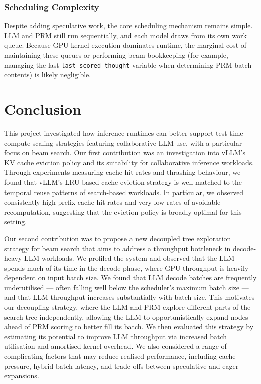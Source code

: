 \documentclass[11pt,twoside]{report}
\begin{document}

\subsection{Scheduling Complexity}
Despite adding speculative work, the core scheduling mechanism remains simple. 
LLM and PRM still run sequentially, and each model draws from its own work queue. 
Because GPU kernel execution dominates runtime, the marginal cost of maintaining these queues or performing beam bookkeeping (for example, managing the last \texttt{last\_scored\_thought} variable when determining PRM batch contents) is likely negligible. 


\chapter{Conclusion}
This project investigated how inference runtimes can better support test-time compute scaling strategies featuring collaborative LLM use, with a particular focus on beam search.
Our first contribution was an investigation into vLLM’s KV cache eviction policy and its suitability for collaborative inference workloads.
Through experiments measuring cache hit rates and thrashing behaviour, we found that vLLM’s LRU-based cache eviction strategy is well-matched to the temporal reuse patterns of search-based workloads.
In particular, we observed consistently high prefix cache hit rates and very low rates of avoidable recomputation, suggesting that the eviction policy is broadly optimal for this setting.

Our second contribution was to propose a new decoupled tree exploration strategy for beam search that aims to address a throughput bottleneck in decode-heavy LLM workloads.
We profiled the system and observed that the LLM spends much of its time in the decode phase, where GPU throughput is heavily dependent on input batch size.
We found that LLM decode batches are frequently underutilised — often falling well below the scheduler's maximum batch size — and that LLM throughput increases substantially with batch size.
This motivates our decoupling strategy, where the LLM and PRM explore different parts of the search tree independently, allowing the LLM to opportunistically expand nodes ahead of PRM scoring to better fill its batch.
We then evaluated this strategy by estimating its potential to improve LLM throughput via increased batch utilisation and amortised kernel overhead.
We also considered a range of complicating factors that may reduce realised performance, including cache pressure, hybrid batch latency, and trade-offs between speculative and eager expansions.
\end{document}
